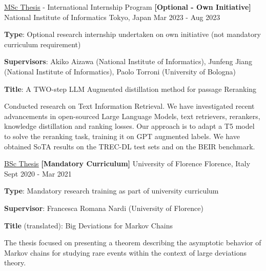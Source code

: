 

\begin{cventries}

  \cventry
    {\href{https://amslaurea.unibo.it/30082/}{\underline{MSc Thesis}} - International Internship Program \textbf{[Optional - Own Initiative]}} %
    {National Institute of Informatics} %
    {Tokyo, Japan} %
    {Mar 2023 - Aug 2023} %
    {
      \begin{cvitems} %
        \item {\textbf{Type}: Optional research internship undertaken on own initiative (not mandatory curriculum requirement)}
        \item {\textbf{Supervisors}: Akiko Aizawa (National Institute of Informatics), Junfeng Jiang (National Institute of Informatics), Paolo Torroni (University of Bologna)} 
        \item {\textbf{Title}: A TWO-step LLM Augmented distillation method for passage Reranking}
        \item {Conducted research on Text Information Retrieval. We have investigated recent advancements in open-sourced Large Language Models, text retrievers, rerankers,  knowledge distillation and ranking losses. Our approach is to adapt a T5 model to solve the reranking task, training it on GPT augmented labels. We have obtained SoTA results on the TREC-DL test sets and on the BEIR benchmark.}
      \end{cvitems}
    }

  \cventry
    {\href{https://github.com/Freddavide/Freddavide/blob/main/elaborato_B036_Baldelli_Davide.pdf}{\underline{BSc Thesis}} \textbf{[Mandatory Curriculum]}} %
    {University of Florence} %
    {Florence, Italy} %
    {Sept 2020 - Mar 2021} %
    {
      \begin{cvitems} %
        \item {\textbf{Type}: Mandatory research training as part of university curriculum}
        \item {\textbf{Supervisor}: Francesca Romana Nardi (University of Florence)}
        \item {\textbf{Title} (translated): Big Deviations for Markov Chains}
        \item {The thesis focused on presenting a theorem describing the asymptotic behavior of Markov chains for studying rare events within the context of large deviations theory.}
      \end{cvitems}
    }



\end{cventries}
